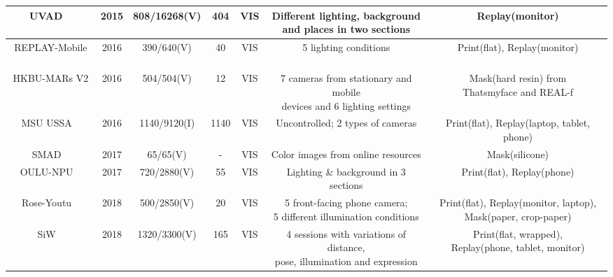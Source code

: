 \documentclass[10pt,journal,compsoc]{IEEEtran}
\begin{document}
\begin{table}
{\begin{tabular}{c c c c c c c}
 \midrule
UVAD
~\cite{pinto2015using} & 2015 & 808/16268(V) & 404 & VIS &  \tabincell{c}{Different lighting, background \\and places in two sections}  & Replay(monitor)\\

 \midrule
REPLAY-Mobile
~\cite{costa2016replay} & 2016 & 390/640(V) & 40 & VIS &  5 lighting conditions & Print(flat), Replay(monitor)\\

 


 \midrule
HKBU-MARs V2
~\cite{liu20163d} & 2016 & 504/504(V) & 12 & VIS &  \tabincell{c}{ 7 cameras from stationary and mobile \\devices and 6 lighting settings} & \tabincell{c}{Mask(hard resin) from \\ Thatsmyface and REAL-f}\\



 \midrule
MSU USSA
~\cite{Patel2016Secure} & 2016 & 1140/9120(I) & 1140 & VIS &  Uncontrolled; 2 types of cameras & Print(flat), Replay(laptop, tablet, phone)\\

 \midrule
SMAD
~\cite{manjani2017detecting} & 2017 & 65/65(V) & - & VIS &  Color images from online resources & Mask(silicone)\\



 \midrule
OULU-NPU
~\cite{Boulkenafet2017OULU} & 2017 &  720/2880(V)  & 55 & VIS &  Lighting \& background in 3 sections  & Print(flat), Replay(phone)\\


 \midrule
Rose-Youtu
~\cite{li2018unsupervised} & 2018 &  500/2850(V) & 20 & VIS &  \tabincell{c}{5 front-facing phone camera; \\5 different illumination conditions}  & \tabincell{c}{Print(flat), Replay(monitor, laptop), \\Mask(paper, crop-paper)}\\



 \midrule
SiW
~\cite{Liu2018Learning} & 2018 &  1320/3300(V)  & 165 & VIS &  \tabincell{c}{4 sessions with variations of distance, \\pose, illumination and expression}  & \tabincell{c}{Print(flat, wrapped), \\Replay(phone, tablet, monitor)}\\




\end{tabular}}
\end{table}
\end{document}
